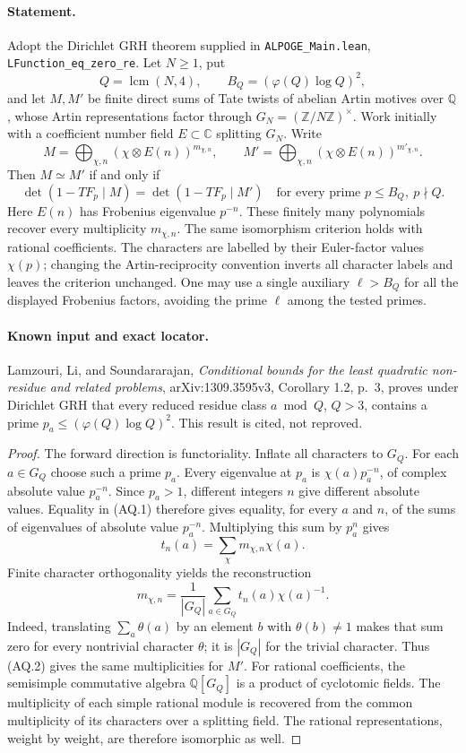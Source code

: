 \documentclass[11pt,a4paper]{article}
\theoremstyle{definition}\newtheorem{definition}[theorem]{Definition}
\theoremstyle{remark}\newtheorem{remark}[theorem]{Remark}
\begin{document}
\paragraph{Statement.}
Adopt the Dirichlet GRH theorem supplied in \nolinkurl{ALPOGE_Main.lean},
\nolinkurl{LFunction_eq_zero_re}. Let $N\geq1$, put
\[
 Q=\operatorname{lcm}(N,4),\qquad B_Q=(\varphi(Q)\log Q)^2,
\]
and let $M,M'$ be finite direct sums of Tate twists of abelian Artin
motives over $\mathbb Q$, whose Artin representations factor through
$G_N=(\mathbb Z/N\mathbb Z)^\times$. Work initially with a coefficient
number field $E\subset\mathbb C$ splitting $G_N$. Write
\[
 M=\bigoplus_{\chi,n}(\chi\otimes E(n))^{m_{\chi,n}},
 \qquad
 M'=\bigoplus_{\chi,n}(\chi\otimes E(n))^{m'_{\chi,n}}.
\]
Then $M\simeq M'$ if and only if
\[
 \det(1-TF_p\mid M)=\det(1-TF_p\mid M')
 \quad\text{for every prime }p\leq B_Q,\ p\nmid Q.                 \tag{AQ.1}
\]
Here $E(n)$ has Frobenius eigenvalue $p^{-n}$. These finitely many
polynomials recover every multiplicity $m_{\chi,n}$. The same
isomorphism criterion holds with rational coefficients.
The characters are labelled by their Euler-factor values
$\chi(p)$; changing the Artin-reciprocity convention inverts
all character labels and leaves the criterion unchanged.
One may use a single auxiliary $\ell>B_Q$ for all the
displayed Frobenius factors, avoiding the prime $\ell$
among the tested primes.

\paragraph{Known input and exact locator.}
Lamzouri, Li, and Soundararajan, \emph{Conditional bounds for the least
quadratic non-residue and related problems}, arXiv:1309.3595v3,
Corollary 1.2, p.~3, proves under Dirichlet GRH that every reduced residue
class $a\bmod Q$, $Q>3$, contains a prime
$p_a\leq(\varphi(Q)\log Q)^2$. This result is cited, not reproved.

\begin{proof}
The forward direction is functoriality. Inflate all characters to $G_Q$.
For each $a\in G_Q$ choose such a prime $p_a$.
Every eigenvalue at $p_a$ is $\chi(a)p_a^{-n}$, of complex absolute
value $p_a^{-n}$. Since $p_a>1$, different integers $n$ give different
absolute values. Equality in (AQ.1) therefore gives equality,
for every $a$ and $n$, of the sums of eigenvalues of absolute
value $p_a^{-n}$. Multiplying this sum by $p_a^n$ gives
\[
 t_n(a)=\sum_\chi m_{\chi,n}\chi(a).
\]
Finite character orthogonality yields the reconstruction
\[
 m_{\chi,n}=\frac1{|G_Q|}\sum_{a\in G_Q}
             t_n(a)\chi(a)^{-1}.                                \tag{AQ.2}
\]
Indeed, translating $\sum_a\theta(a)$ by an element $b$ with
$\theta(b)\ne1$ makes that sum zero for every nontrivial character
$\theta$; it is $|G_Q|$ for the trivial character. Thus (AQ.2)
gives the same multiplicities for $M'$.
For rational coefficients, the semisimple commutative algebra
$\mathbb Q[G_Q]$ is a product of cyclotomic fields. The
multiplicity of each simple rational module is recovered from
the common multiplicity of its characters over a splitting field.
The rational representations, weight by weight, are therefore
isomorphic as well.
\end{proof}
\end{document}
